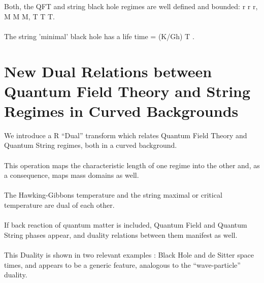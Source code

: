 \documentclass[12pt,a4paper]{article}
\begin{document}
Both, the QFT and string black hole regimes are well defined and bounded:  
r\coordHE{} r\myHighlight{$_{+} \le$}\coordHE{} r\coordHE{}, 
M\coordHE{} M\myHighlight{$_{+} \le$}\coordHE{} M\coordHE{}, 
T\coordHE{} T\myHighlight{$_{+} \le$}\coordHE{} T\coordHE{}.\\ \\
The string 'minimal' black hole has a life time 
\coordHE{} = (K/Gh) T\coordHE{}  \coordHE{}. \\
 \section{New Dual Relations between Quantum Field Theory and String Regimes 
in Curved Backgrounds}
We introduce a R ``Dual'' transform which relates Quantum Field Theory and 
Quantum String regimes, both in a curved background.\\ \\
This operation maps the characteristic length of one regime into the other 
and, as a consequence, maps mass domains as well.\\ \\
The Hawking-Gibbons temperature and the string maximal or critical temperature 
are dual of each other.\\ \\
If back reaction of quantum matter is included, Quantum Field and Quantum 
String phases appear, and duality relations between them manifest as well.\\ \\
This Duality is shown in two relevant examples : Black Hole and de Sitter space times, and appears to be a generic feature, analogous to the ``wave-particle'' duality.\\
\end{document}
